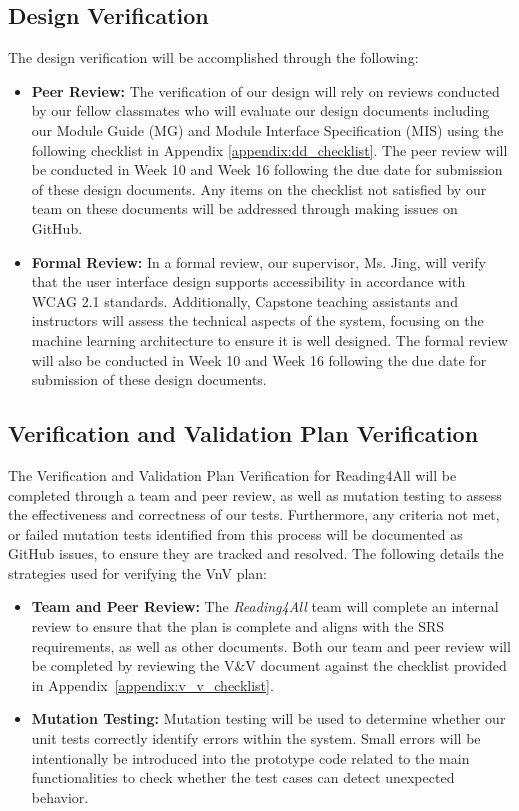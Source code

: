 \documentclass[12pt, titlepage]{article}
\begin{document}
\subsection{Design Verification}
The design verification will be accomplished through the following:
\begin{itemize}
  \item \textbf{Peer Review:} The verification of our design will
    rely on reviews conducted by our fellow classmates who will
    evaluate our design documents including our Module Guide (MG) and
    Module Interface Specification (MIS) using the following
    checklist in Appendix \ref{appendix:dd_checklist}. The peer review will
    be conducted in Week 10 and Week 16 following the due date for
    submission of these design documents.
    Any items on the checklist not satisfied by our team on these
    documents will be addressed through making issues on GitHub.
  \item \textbf{Formal Review:} In a formal review, our supervisor,
    Ms. Jing, will verify that the user interface design supports
    accessibility in accordance with WCAG 2.1 standards.
    Additionally, Capstone teaching assistants and instructors will
    assess the technical aspects of the system, focusing on the
    machine learning architecture to ensure it is well designed.
    The formal review will also be conducted in Week 10 and Week 16
    following the due date for submission of these design documents.
\end{itemize}

\subsection{Verification and Validation Plan Verification}

The Verification and Validation Plan Verification for Reading4All will be completed through a team and peer review,
as well as mutation testing to assess the effectiveness and correctness of our
tests. Furthermore, any criteria not met, or failed mutation tests identified
from this process will be documented as GitHub issues, to ensure they are
tracked and resolved. The following details the 
strategies used for verifying the VnV plan: 

\begin{itemize}
  \item \textbf{Team and Peer Review:}
  The \textit{Reading4All} team will complete an internal review to
  ensure that the plan is complete and aligns with the SRS
  requirements, as well as other documents.
  Both our team and peer review will be completed by reviewing the V\&V
  document against the checklist provided in
  Appendix~\ref{appendix:v_v_checklist}.  
  
  \item \textbf{Mutation Testing:}
  Mutation testing will be used to determine whether our unit tests
  correctly identify errors within the system.
  Small errors will be intentionally be introduced into the prototype
  code related to the main functionalities to check whether the test
  cases can detect unexpected behavior.
\end{itemize}
\end{document}
